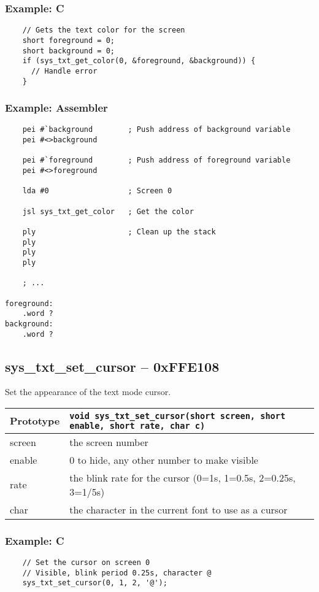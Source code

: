 \subsubsection*{Example: C}
\begin{lstlisting}
    // Gets the text color for the screen
    short foreground = 0;
    short background = 0;
    if (sys_txt_get_color(0, &foreground, &background)) {
      // Handle error
    }
\end{lstlisting}

\subsubsection*{Example: Assembler}
\begin{verbatim}
    pei #`background        ; Push address of background variable
    pei #<>background

    pei #`foreground        ; Push address of foreground variable
    pei #<>foreground

    lda #0                  ; Screen 0

    jsl sys_txt_get_color   ; Get the color

    ply                     ; Clean up the stack
    ply
    ply
    ply

    ; ...

foreground:
    .word ?
background:
    .word ?
\end{verbatim}

\subsection*{sys\_txt\_set\_cursor -- 0xFFE108}
Set the appearance of the text mode cursor.

\bigskip

\begin{tabular}{|l||l|} \hline
Prototype & \lstinline!void sys_txt_set_cursor(short screen, short enable, short rate, char c)! \\ \hline
screen & the screen number \\ \hline
enable & 0 to hide, any other number to make visible \\ \hline
rate & the blink rate for the cursor (0=1s, 1=0.5s, 2=0.25s, 3=1/5s) \\ \hline
char & the character in the current font to use as a cursor \\ \hline
\end{tabular}

\subsubsection*{Example: C}
\begin{lstlisting}
    // Set the cursor on screen 0
	// Visible, blink period 0.25s, character @
    sys_txt_set_cursor(0, 1, 2, '@');
\end{lstlisting}

